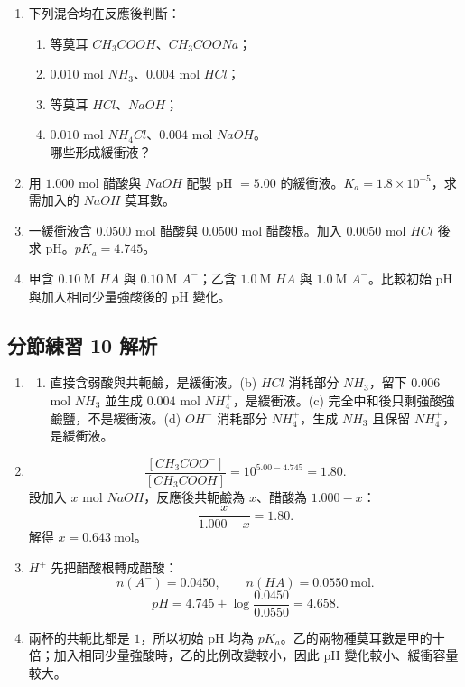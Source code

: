 \documentclass[11pt,a4paper]{article}
\providecommand{\tightlist}{%
  \setlength{\itemsep}{0pt}\setlength{\parskip}{0pt}}
\begin{document}
\begin{enumerate}
\def\labelenumi{\arabic{enumi}.}
\tightlist
\item
  下列混合均在反應後判斷：

  \begin{enumerate}
  \def\labelenumii{(\alph{enumii})}
  \tightlist
  \item
    等莫耳 \(CH_3COOH\)、\(CH_3COONa\)；\\
  \item
    \(0.010\) mol \(NH_3\)、\(0.004\) mol \(HCl\)；\\
  \item
    等莫耳 \(HCl\)、\(NaOH\)；\\
  \item
    \(0.010\) mol \(NH_4Cl\)、\(0.004\) mol \(NaOH\)。\\
    哪些形成緩衝液？
  \end{enumerate}
\item
  用 \(1.000\) mol 醋酸與 \(NaOH\) 配製 pH \(=5.00\) 的緩衝液。\(K_a=1.8\times10^{-5}\)，求需加入的 \(NaOH\) 莫耳數。
\item
  一緩衝液含 \(0.0500\) mol 醋酸與 \(0.0500\) mol 醋酸根。加入 \(0.0050\) mol \(HCl\) 後求 pH。\(pK_a=4.745\)。
\item
  甲含 \(0.10\ \mathrm M\) \(HA\) 與 \(0.10\ \mathrm M\) \(A^-\)；乙含 \(1.0\ \mathrm M\) \(HA\) 與 \(1.0\ \mathrm M\) \(A^-\)。比較初始 pH 與加入相同少量強酸後的 pH 變化。
\end{enumerate}

\subsection{分節練習 10 解析}\label{ux5206ux7bc0ux7df4ux7fd2-10-ux89e3ux6790}

\begin{enumerate}
\def\labelenumi{\arabic{enumi}.}
\tightlist
\item
  \begin{enumerate}
  \def\labelenumii{(\alph{enumii})}
  \tightlist
  \item
    直接含弱酸與共軛鹼，是緩衝液。(b) \(HCl\) 消耗部分 \(NH_3\)，留下 \(0.006\) mol \(NH_3\) 並生成 \(0.004\) mol \(NH_4^+\)，是緩衝液。(c) 完全中和後只剩強酸強鹼鹽，不是緩衝液。(d) \(OH^-\) 消耗部分 \(NH_4^+\)，生成 \(NH_3\) 且保留 \(NH_4^+\)，是緩衝液。
  \end{enumerate}
\item
  \[
   \frac{[CH_3COO^-]}{[CH_3COOH]}
   =10^{5.00-4.745}=1.80.
   \]
  設加入 \(x\) mol \(NaOH\)，反應後共軛鹼為 \(x\)、醋酸為 \(1.000-x\)：
  \[
   \frac{x}{1.000-x}=1.80.
   \]
  解得 \(x=0.643\ \mathrm{mol}\)。
\item
  \(H^+\) 先把醋酸根轉成醋酸：
  \[
  n(A^-)=0.0450,\qquad n(HA)=0.0550\ \mathrm{mol}.
  \]
  \[
  pH=4.745+\log\frac{0.0450}{0.0550}=4.658.
  \]
\item
  兩杯的共軛比都是 \(1\)，所以初始 pH 均為 \(pK_a\)。乙的兩物種莫耳數是甲的十倍；加入相同少量強酸時，乙的比例改變較小，因此 pH 變化較小、緩衝容量較大。
\end{enumerate}
\end{document}

